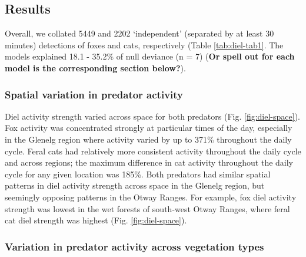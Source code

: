 \documentclass[11pt,a4paper,titlepage,twoside,openright]{style/unimelbthesis}
\begin{document}
\begin{mainmatter}
\hypertarget{results-3}{%
\section{Results}\label{results-3}}

Overall, we collated 5449 and 2202 `independent' (separated by at least 30 minutes) detections of foxes and cats, respectively (Table \ref{tab:diel-tab1}. The models explained 18.1 - 35.2\% of null deviance (n = 7) (\textbf{Or spell out for each model is the corresponding section below?}).

\hypertarget{spatial-variation-in-predator-activity-1}{%
\subsubsection{Spatial variation in predator activity}\label{spatial-variation-in-predator-activity-1}}

Diel activity strength varied across space for both predators (Fig. \ref{fig:diel-space}). Fox activity was concentrated strongly at particular times of the day, especially in the Glenelg region where activity varied by up to 371\% throughout the daily cycle. Feral cats had relatively more consistent activity throughout the daily cycle and across regions; the maximum difference in cat activity throughout the daily cycle for any given location was 185\%. Both predators had similar spatial patterns in diel activity strength across space in the Glenelg region, but seemingly opposing patterns in the Otway Ranges. For example, fox diel activity strength was lowest in the wet forests of south-west Otway Ranges, where feral cat diel strength was highest (Fig. \ref{fig:diel-space}).

\hypertarget{variation-in-predator-activity-across-vegetation-types-1}{%
\subsubsection{Variation in predator activity across vegetation types}\label{variation-in-predator-activity-across-vegetation-types-1}}


\end{mainmatter}
\end{document}
